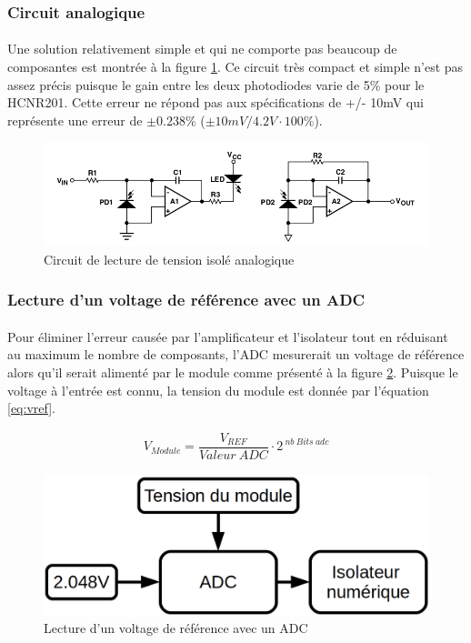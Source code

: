 	\subsubsection*{Circuit analogique}
	\paragraph*{}
	Une solution relativement simple et qui ne comporte pas beaucoup de composantes est montrée à la figure \ref{fig:HCNR201}. Ce circuit très compact et simple n'est pas assez précis puisque le gain entre les deux photodiodes varie de 5\% pour le HCNR201. Cette erreur ne répond pas aux spécifications de +/- 10mV qui représente une erreur de $\pm 0.238 \%$ ($\pm 10mV / 4.2V \cdot 100 \%$).  
	
	\begin{figure}[H]
		\centering
		\includegraphics[scale = 0.5]{Images/Analogique.png}
		\caption{Circuit de lecture de tension isolé analogique \cite{HCNR201}}
		\label{fig:HCNR201}
	\end{figure}


	\newpage
	\subsubsection*{Lecture d'un voltage de référence avec un ADC}
	\paragraph*{}	
	Pour éliminer l'erreur causée par l'amplificateur et l'isolateur tout en réduisant au maximum le nombre de composants, l'ADC mesurerait un voltage de référence alors qu'il serait alimenté par le module comme présenté à la figure \ref{fig:adc_vref}. Puisque le voltage à l'entrée est connu, la tension du module est donnée par l'équation \ref{eq:vref}.
	
	\begin{align}
		V_{Module} = \dfrac{V_{REF}}{Valeur~ADC} \cdot 2^{~nb~Bits~adc}
		\label{eq:vref}
	\end{align}
	
	\begin{figure}[H]
		\centering
		\includegraphics[scale=0.3]{Images/Voltage_reference.png}
		\caption{Lecture d'un voltage de référence avec un ADC}
		\label{fig:adc_vref}
	\end{figure}
	
